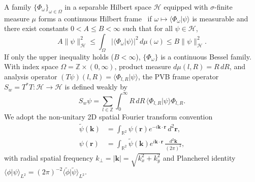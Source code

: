 \documentclass[aps,pra,reprint,amsmath,amssymb,floatfix,longbibliography]{revtex4-2}
\providecommand{\braket}[2]{\langle#1\vert#2\rangle}
\providecommand{\abs}[1]{\lvert#1\rvert}
\providecommand{\norm}[1]{\lVert#1\rVert}
\begin{document}
A family $\{\Phi_\omega\}_{\omega\in\Omega}$ in a separable Hilbert space $\mathcal{H}$ equipped with $\sigma$-finite measure $\mu$ forms a continuous Hilbert frame~\cite{Duffin1952,Daubechies1990,Ali1993,Christensen2016} if $\omega \mapsto \braket{\Phi_\omega}{\psi}$ is measurable and there exist constants $0 < A \le B < \infty$ such that for all $\psi \in \mathcal{H}$,
\begin{equation}
A \norm{\psi}_{\mathcal{H}}^2 \le \int_\Omega \abs{\braket{\Phi_\omega}{\psi}}^2\,d\mu(\omega) \le B \norm{\psi}_{\mathcal{H}}^2.
\label{eq:frame_def}
\end{equation}
If only the upper inequality holds ($B < \infty$), $\{\Phi_\omega\}$ is a continuous Bessel family. With index space $\Omega = \mathbb{Z} \times (0,\infty)$, product measure $d\mu(l,R) = R\,dR$, and analysis operator $(T\psi)(l,R) = \braket{\Phi_{l,R}}{\psi}$, the PVB frame operator $S_w = T^* T : \mathcal{H} \to \mathcal{H}$ is defined weakly by
\begin{equation}
S_w\psi = \sum_{l\in\mathbb{Z}} \int_0^\infty R\,dR\, \braket{\Phi_{l,R}}{\psi}\Phi_{l,R}.
\label{eq:frame_op}
\end{equation}
We adopt the non-unitary 2D spatial Fourier transform convention
\begin{align}
\widetilde{\psi}(\mathbf{k}) &= \int_{\mathbb{R}^2} \psi(\mathbf{r}) e^{-i\mathbf{k}\cdot\mathbf{r}}\,d^2\mathbf{r}, \nonumber \\
\psi(\mathbf{r}) &= \int_{\mathbb{R}^2} \widetilde{\psi}(\mathbf{k}) e^{i\mathbf{k}\cdot\mathbf{r}}\,\frac{d^2\mathbf{k}}{(2\pi)^2},
\label{eq:ft_convention}
\end{align}
with radial spatial frequency $k_\perp = \abs{\mathbf{k}} = \sqrt{k_x^2 + k_y^2}$ and Plancherel identity $\braket{\phi}{\psi}_{L^2} = (2\pi)^{-2}\braket{\widetilde{\phi}}{\widetilde{\psi}}_{L^2}$.
\end{document}

